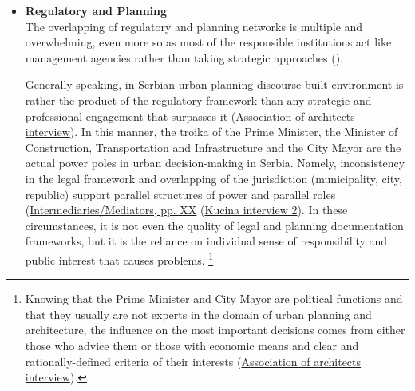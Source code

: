 \documentclass[11pt]{report}
\begin{document}
\begin{itemize}
Similar dependence on global trends and circumstances is obvious in growing involvement of foreign investors and investments funds in the real estate in Serbia. The consequences of political treatment of property and discrepancy between planning and implementation during socialism take its toll being still at play through fast-moving, profit-oriented practices under neoliberalism and transition - once built, the structures are more difficult to change, which has been the logic of BWP\footnote{Despite the double rejection for the building permit from the Ministry of Construction, Transportation and Infrastructure, the coastal fortification was finalized during 2016. It is difficult to estimate, but, having two residential towers under construction nearby, it is very unlikely that the coastal fortification will be dismantled and removed, or even adjusted to the local technical requirements.}
(\href{}{Association of architects interview}).
\\

\item \textbf{Regulatory and Planning}
\\
The overlapping of regulatory and planning networks is multiple and overwhelming, even more so as most of the responsible institutions act like management agencies rather than taking strategic approaches (\cite{Vujosevic 2012}).

Generally speaking, in Serbian urban planning discourse built environment is rather the product of the regulatory framework than any strategic and professional engagement that surpasses it (\href{}{Association of architects interview}). In this manner, the troika of the Prime Minister, the Minister of Construction, Transportation and Infrastructure and the City Mayor are the actual power poles in urban decision-making in Serbia. Namely, inconsistency in the legal framework and overlapping of the jurisdiction (municipality, city, republic) support parallel structures of power and parallel roles (\href{}{Intermediaries/Mediators, pp. XX} (\href{}{Kucina interview 2}).
In these circumstances, it is not even the quality of legal and planning documentation frameworks, but it is the reliance on individual sense of responsibility and public interest that causes problems.
\footnote{Knowing that the Prime Minister and City Mayor are political functions and that they usually are not experts in the domain of urban planning and architecture, the influence on the most important decisions comes from either those who advice them or those with economic means and clear and rationally-defined criteria of their interests
(\href{}{Association of architects interview}).}


\end{itemize}
\end{document}
